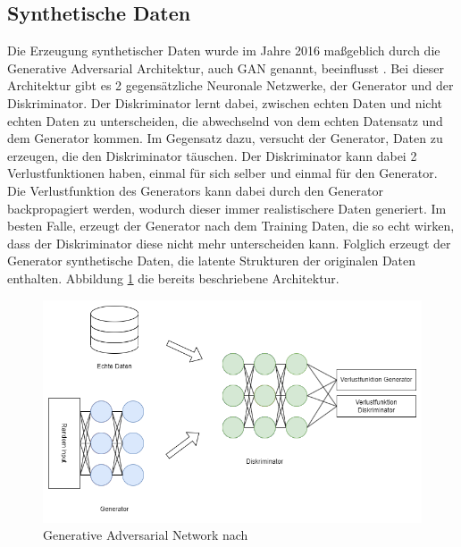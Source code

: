 \subsection{Synthetische Daten}\label{sec:synthetic_data}

Die Erzeugung synthetischer Daten wurde im Jahre 2016 maßgeblich durch die Generative Adversarial Architektur, auch GAN genannt, beeinflusst \cite{P-86}. 
Bei dieser Architektur gibt es 2 gegensätzliche Neuronale Netzwerke, der Generator und der Diskriminator. 
Der Diskriminator lernt dabei, zwischen echten Daten und nicht echten Daten zu unterscheiden, die abwechselnd von dem echten Datensatz und dem Generator kommen.
Im Gegensatz dazu, versucht der Generator, Daten zu erzeugen, die den Diskriminator täuschen. 
Der Diskriminator kann dabei 2 Verlustfunktionen haben, einmal für sich selber und einmal für den Generator.
Die Verlustfunktion des Generators kann dabei durch den Generator backpropagiert werden, wodurch dieser immer realistischere Daten generiert.
Im besten Falle, erzeugt der Generator nach dem Training Daten, die so echt wirken, dass der Diskriminator diese nicht mehr unterscheiden kann.
Folglich erzeugt der Generator synthetische Daten, die latente Strukturen der originalen Daten enthalten.
Abbildung \ref{fig:gan} die bereits beschriebene Architektur.

\begin{figure}[!htb]
    \centering
    \includegraphics[width=14cm]{figures/gan}
    \caption{Generative Adversarial Network nach \cite{P-86}}
    \label{fig:gan}
\end{figure} 

